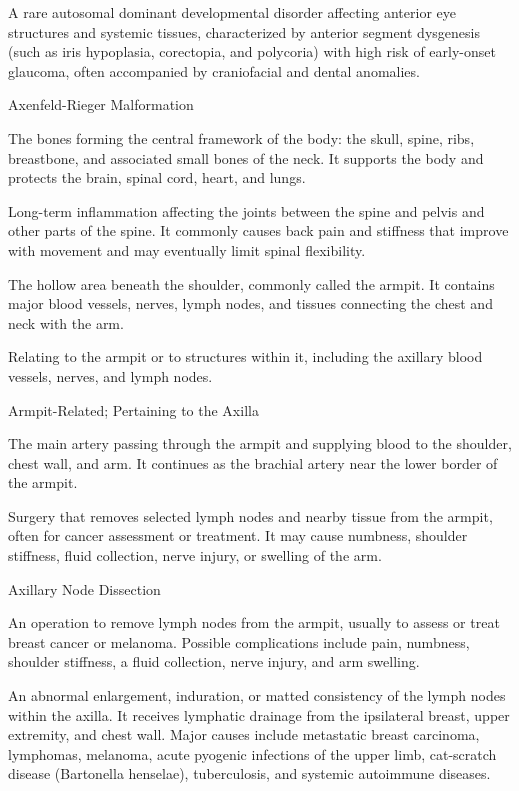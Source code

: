  A rare autosomal dominant developmental disorder affecting anterior eye structures and systemic tissues, characterized by anterior segment dysgenesis (such as iris hypoplasia, corectopia, and polycoria) with high risk of early-onset glaucoma, often accompanied by craniofacial and dental anomalies.

\synonyms
Axenfeld-Rieger Malformation

 The bones forming the central framework of the body: the skull, spine, ribs, breastbone, and associated small bones of the neck. It supports the body and protects the brain, spinal cord, heart, and lungs.

 Long-term inflammation affecting the joints between the spine and pelvis and other parts of the spine. It commonly causes back pain and stiffness that improve with movement and may eventually limit spinal flexibility.

 The hollow area beneath the shoulder, commonly called the armpit. It contains major blood vessels, nerves, lymph nodes, and tissues connecting the chest and neck with the arm.

 Relating to the armpit or to structures within it, including the axillary blood vessels, nerves, and lymph nodes.

\synonyms
Armpit-Related; Pertaining to the Axilla

 The main artery passing through the armpit and supplying blood to the shoulder, chest wall, and arm. It continues as the brachial artery near the lower border of the armpit.

 Surgery that removes selected lymph nodes and nearby tissue from the armpit, often for cancer assessment or treatment. It may cause numbness, shoulder stiffness, fluid collection, nerve injury, or swelling of the arm.

\synonyms
Axillary Node Dissection

 An operation to remove lymph nodes from the armpit, usually to assess or treat breast cancer or melanoma. Possible complications include pain, numbness, shoulder stiffness, a fluid collection, nerve injury, and arm swelling.

 An abnormal enlargement, induration, or matted consistency of the lymph nodes within the axilla. It receives lymphatic drainage from the ipsilateral breast, upper extremity, and chest wall. Major causes include metastatic breast carcinoma, lymphomas, melanoma, acute pyogenic infections of the upper limb, cat-scratch disease (Bartonella henselae), tuberculosis, and systemic autoimmune diseases.

